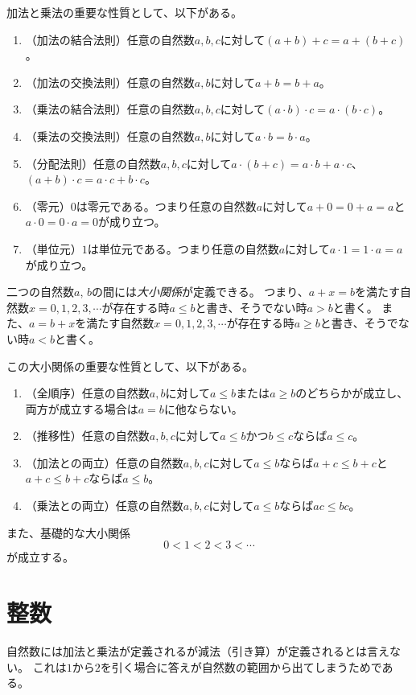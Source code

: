 加法と乗法の重要な性質として、以下がある。
\begin{enumerate}
\item
（加法の結合法則）任意の自然数$a, b, c$に対して$(a+b)+c = a+(b+c)$。
\item
（加法の交換法則）任意の自然数$a, b$に対して$a+b = b+a$。
\item
（乗法の結合法則）任意の自然数$a, b, c$に対して$(a\cdot b)\cdot c = a\cdot (b\cdot c)$。
\item
（乗法の交換法則）任意の自然数$a, b$に対して$a\cdot b = b\cdot a$。
\item
（分配法則）任意の自然数$a, b, c$に対して$a\cdot (b+c) = a\cdot b+a\cdot c$、$(a+b)\cdot c = a\cdot c+b\cdot c$。
\item
（零元）$0$は零元である。つまり任意の自然数$a$に対して$a+0 = 0+a = a$と$a\cdot 0 = 0\cdot a = 0$が成り立つ。
\item
（単位元）$1$は単位元である。つまり任意の自然数$a$に対して$a\cdot 1 = 1\cdot a = a$が成り立つ。
\end{enumerate}

二つの自然数$a$, $b$の間には\emph{大小関係}が定義できる。
つまり、$a+x = b$を満たす自然数$x = 0, 1, 2, 3, \cdots$が存在する時$a \le b$と書き、そうでない時$a > b$と書く。
また、$a = b+x$を満たす自然数$x = 0, 1, 2, 3, \cdots$が存在する時$a \ge b$と書き、そうでない時$a < b$と書く。

この大小関係の重要な性質として、以下がある。
\begin{enumerate}
\item
（全順序）任意の自然数$a, b$に対して$a \le b$または$a \ge b$のどちらかが成立し、両方が成立する場合は$a = b$に他ならない。
\item
（推移性）任意の自然数$a, b, c$に対して$a \le b$かつ$b \le c$ならば$a \le c$。
\item
（加法との両立）任意の自然数$a, b, c$に対して$a \le b$ならば$a+c \le b+c$と$a+c \le b+c$ならば$a \le b$。
\item
（乗法との両立）任意の自然数$a, b, c$に対して$a \le b$ならば$a c \le b c$。
\end{enumerate}

また、基礎的な大小関係
$$
0 < 1 < 2 < 3 < \cdots
$$
が成立する。

\section{整数}

自然数には加法と乗法が定義されるが減法（引き算）が定義されるとは言えない。
これは$1$から$2$を引く場合に答えが自然数の範囲から出てしまうためである。

